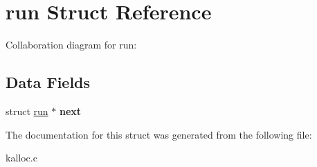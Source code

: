 \hypertarget{structrun}{}\section{run Struct Reference}
\label{structrun}


Collaboration diagram for run\+:
\subsection*{Data Fields}
\begin{DoxyCompactItemize}
\item 
\mbox{\label{structrun_a268099adb9e6c607cd814a421a1c8a18}} 
struct \mbox{\hyperlink{structrun}{run}} $\ast$ {\bfseries next}
\end{DoxyCompactItemize}


The documentation for this struct was generated from the following file\+:\begin{DoxyCompactItemize}
\item 
kalloc.\+c\end{DoxyCompactItemize}
